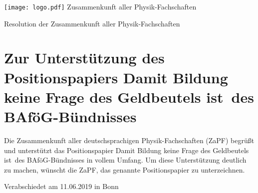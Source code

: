 ﻿\documentclass[DIV=calc]{scrartcl}
\begin{document}
\hspace{0.87\textwidth}
\begin{minipage}{120pt}
\vspace{-1.8cm}
\texttt{[image: logo.pdf]}
\centering
\small Zusammenkunft aller Physik-Fachschaften
\end{minipage}

\begin{center}
\huge{Resolution der Zusammenkunft aller Physik-Fachschaften}\vspace{.25\baselineskip}\\
\normalsize
\end{center}
\vspace{1cm}


\section*{Zur Unterstützung des Positionspapiers \glqq Damit Bildung keine Frage des Geldbeutels ist\grqq\ des BAföG-Bündnisses}



Die Zusammenkunft aller deutschsprachigen Physik-Fachschaften (ZaPF) begrüßt und unterstützt das Positionspapier \glqq Damit Bildung keine Frage des Geldbeutels ist\grqq\ des BAföG-Bündnisses in vollem Umfang. Um diese Unterstützung deutlich zu machen, wünscht die ZaPF, das genannte Positionspapier zu unterzeichnen.
    
\vspace*{\fill}
\begin{flushright}
Verabschiedet am 11.06.2019 in Bonn
\end{flushright}
\end{document}
